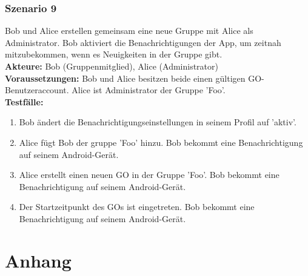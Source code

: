 \documentclass[parskip=full]{scrartcl}
\def\threedigits#1{%
  \ifnum#1<100 0\fi
  \ifnum#1<10 0\fi
  \number#1}
\begin{document}
\subsubsection*{Szenario 9} Bob und Alice erstellen gemeinsam eine neue Gruppe mit Alice als Administrator. Bob aktiviert die Benachrichtigungen der App, um zeitnah mitzubekommen, wenn es Neuigkeiten in der Gruppe gibt.\\

\textbf{Akteure: }Bob (Gruppenmitglied), Alice (Administrator)\\

\textbf{Voraussetzungen: }Bob und Alice besitzen beide einen gültigen GO-Benutzeraccount. Alice ist Administrator der Gruppe 'Foo'.\\

\textbf{Testfälle:}\\
\begin{enumerate}[label={\textbf{/T\protect\threedigits{\theenumi}0/}}, leftmargin=*, resume]
	\item Bob ändert die Benachrichtigungseinstellungen in seinem Profil auf 'aktiv'.
	\item Alice fügt Bob der gruppe 'Foo' hinzu. Bob bekommt eine Benachrichtigung auf seinem Android-Gerät.
	\item Alice erstellt einen neuen GO in der Gruppe 'Foo'. Bob bekommt eine Benachrichtigung auf seinem Android-Gerät.
	\item Der Startzeitpunkt des GOs ist eingetreten. Bob bekommt eine Benachrichtigung auf seinem Android-Gerät.
\end{enumerate}

\newpage
\section{Anhang}

\newpage
\printglossary	
\end{document}
